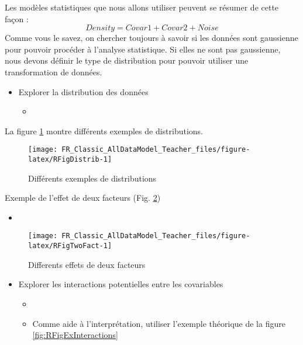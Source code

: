 \documentclass[french,a4paper]{article}
\providecommand{\tightlist}{%
  \setlength{\itemsep}{0pt}\setlength{\parskip}{0pt}}
\begin{document}
Les modèles statistiques que nous allons utiliser peuvent se résumer de cette façon :
\[Density = Covar1 + Covar2 + Noise\]
Comme vous le savez, on chercher toujours à savoir si les données sont gaussienne pour pouvoir procéder à l'analyse statistique. Si elles ne sont pas gaussienne, nous devons définir le type de distribution pour pouvoir utiliser une transformation de données.

\begin{itemize}
\tightlist
\item
  Explorer la distribution des données

  \begin{itemize}
  \item
  \end{itemize}
\end{itemize}

La figure \ref{fig:RFigDistrib} montre différents exemples de distributions.



\begin{figure}[!h]

{\centering \texttt{[image: FR\_Classic\_AllDataModel\_Teacher\_files/figure-latex/RFigDistrib-1]} 

}

\caption{Différents exemples de distributions\\}\label{fig:RFigDistrib}
\end{figure}

Exemple de l'effet de deux facteurs (Fig. \ref{fig:RFigTwoFact})



\begin{itemize}
\item
\end{itemize}

\begin{figure}[!h]

{\centering \texttt{[image: FR\_Classic\_AllDataModel\_Teacher\_files/figure-latex/RFigTwoFact-1]} 

}

\caption{Differents effets de deux facteurs}\label{fig:RFigTwoFact}
\end{figure}

\begin{itemize}
\tightlist
\item
  Explorer les interactions potentielles entre les covariables

  \begin{itemize}
  \item
  \item
    Comme aide à l'interprétation, utiliser l'exemple théorique de la figure \ref{fig:RFigExInteractions}
  \end{itemize}
\end{itemize}
\end{document}
